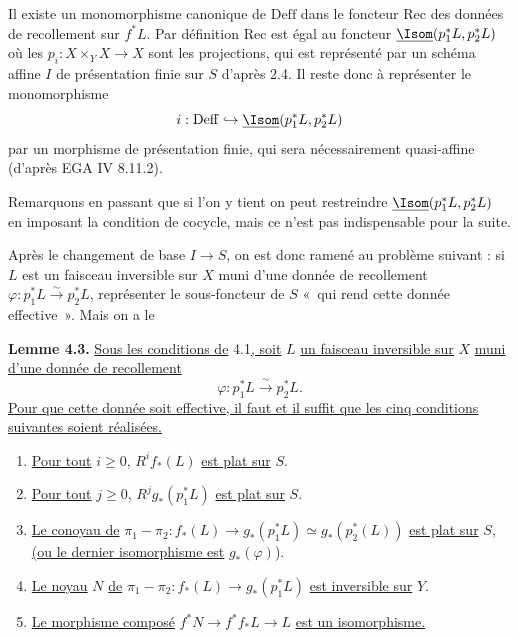 Il
existe un monomorphisme canonique de \(\mathrm{Deff}\) dans le foncteur \(\mathrm{Rec}\) des données de recollement sur \(f^*L\). Par définition \(\mathrm{Rec}\) est égal au foncteur \(\underline{\Isom}(p_1^*L,p_2^*L)\) où les \(p_i:X\times_YX\to X\) sont les projections, qui est représenté par un schéma affine \(I\) de présentation finie sur \(S\) d'après 2.4. Il reste donc à représenter le monomorphisme
\[
  i:\mathrm{Deff}\hookrightarrow \underline{\Isom}(p_1^*L,p_2^*L)
\]
par un morphisme de présentation finie, qui sera nécessairement quasi-affine (d'après EGA IV 8.11.2).

Remarquons en passant que si l'on y tient on peut restreindre \(\underline{\Isom}(p_1^*L,p_2^*L)\) en imposant la condition de cocycle, mais ce n'est pas indispensable pour la suite.

Après le changement de base \(I\to S\), on est donc ramené au problème suivant : si \(L\) est un faisceau inversible sur \(X\) muni d'une donnée de recollement \(\varphi:p_1^*L\xrightarrow{\sim}p_2^*L\), représenter le sous-foncteur de \(S\) «~qui rend cette donnée effective~». Mais on a le

\textbf{Lemme 4.3.} \uline{Sous les conditions de} 4.1\uline{, soit} \(L\) \uline{un faisceau inversible sur} \(X\) \uline{muni d'une donnée de recollement}
\[
  \varphi:p_1^*L\xrightarrow{\sim}p_2^*L.
\]
\uline{Pour que cette donnée soit effective, il faut et il suffit que les cinq conditions suivantes soient réalisées.}
\begin{enumerate}[label=\arabic*)]
\item \uline{Pour tout} \(i\ge0\), \(R^if_*(L)\) \uline{est plat sur} \(S\).
\item \uline{Pour tout} \(j\ge0\), \(R^jg_*(p_1^*L)\) \uline{est plat sur} \(S\).
\item \uline{Le conoyau de} \(\pi_1-\pi_2:f_*(L)\longrightarrow g_*(p_1^*L)\simeq g_*(p_2^*(L))\) \uline{est plat sur} \(S\)\uline{, (ou le dernier isomorphisme est} \(g_*(\varphi)\)).
\item \uline{Le noyau} \(N\) \uline{de} \(\pi_1-\pi_2:f_*(L)\to g_*(p_1^*L)\) \uline{est inversible sur} \(Y\).
\item \uline{Le morphisme composé} \(f^*N\to f^*f_*L\to L\) \uline{est un isomorphisme.}
\end{enumerate}
